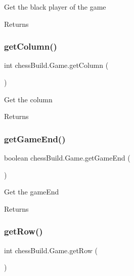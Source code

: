 Get the black player of the game \begin{DoxyReturn}{Returns}

\end{DoxyReturn}
\mbox{\label{classchess_build_1_1_game_a6c917e051708604f5385062146e2880c}} 
\subsubsection{\texorpdfstring{get\+Column()}{getColumn()}}
{\footnotesize\ttfamily int chess\+Build.\+Game.\+get\+Column (\begin{DoxyParamCaption}{ }\end{DoxyParamCaption})}

Get the column \begin{DoxyReturn}{Returns}

\end{DoxyReturn}
\mbox{\label{classchess_build_1_1_game_abf2a3e04a58e0ed986dc5951002b3af6}} 
\subsubsection{\texorpdfstring{get\+Game\+End()}{getGameEnd()}}
{\footnotesize\ttfamily boolean chess\+Build.\+Game.\+get\+Game\+End (\begin{DoxyParamCaption}{ }\end{DoxyParamCaption})}

Get the game\+End \begin{DoxyReturn}{Returns}

\end{DoxyReturn}
\mbox{\label{classchess_build_1_1_game_a6271b0abcddb945758b3a70ec3a2be47}} 
\subsubsection{\texorpdfstring{get\+Row()}{getRow()}}
{\footnotesize\ttfamily int chess\+Build.\+Game.\+get\+Row (\begin{DoxyParamCaption}{ }\end{DoxyParamCaption})}

